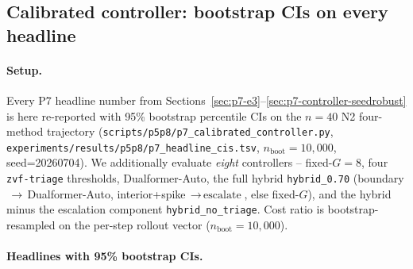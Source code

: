 \documentclass{article}
\begin{document}
\subsection{Calibrated controller: bootstrap CIs on every headline}
\label{sec:p7-calibrated}
\paragraph{Setup.}
Every P7 headline number from Sections~\ref{sec:p7-e3}--\ref{sec:p7-controller-seedrobust}
is here re-reported with 95\% bootstrap percentile CIs on the
$n{=}40$ N2 four-method trajectory
(\texttt{scripts/p5p8/p7\_calibrated\_controller.py},
\texttt{experiments/results/p5p8/p7\_headline\_cis.tsv},
$n_{\text{boot}}{=}10{,}000$, seed=20260704). We additionally
evaluate \emph{eight} controllers -- fixed-$G{=}8$, four
\texttt{zvf-triage} thresholds, Dualformer-Auto, the full hybrid
\texttt{hybrid\_0.70} (boundary$\,\to\,$Dualformer-Auto,
interior+spike$\,\to\,\text{escalate}$, else fixed-$G$), and the
hybrid minus the escalation component \texttt{hybrid\_no\_triage}.
Cost ratio is bootstrap-resampled on the per-step rollout vector
($n_{\text{boot}}{=}10{,}000$).

\paragraph{Headlines with 95\% bootstrap CIs.}
\end{document}
